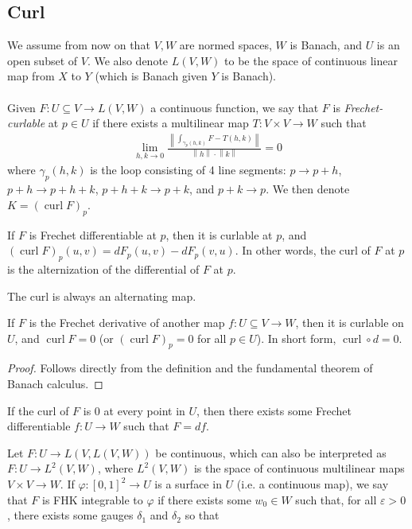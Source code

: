 \documentclass{treatise}
\begin{document}
\begin{shaded}
\subsection{Curl}
We assume from now on that $V, W$ are normed spaces, $W$ is Banach, and $U$ is an open subset of $V$. We also denote $L(V, W)$ to be the space of continuous linear map from $X$ to $Y$ (which is Banach given $Y$ is Banach).
\\
\\
Given $F: U \subseteq V \to L(V, W)$ a continuous function, we say that $F$ is \emph{Frechet-curlable} at $p \in U$ if there exists a multilinear map $T: V \times V \to W$ such that
\begin{align*}
\lim_{h, k \to 0} \frac{\left\lVert \int_{\gamma_p (h, k)} F - T(h, k) \right\rVert}{\left\lVert h \right\rVert \cdot \left\lVert k \right\rVert} = 0
\end{align*}
where $\gamma_p (h, k)$ is the loop consisting of 4 line segments: $p \to p + h$, $p + h \to p + h + k$, $p + h + k \to p + k$, and $p + k \to p$. We then denote $K = (\operatorname{curl} F)_p$.
\begin{theorem}
If $F$ is Frechet differentiable at $p$, then it is curlable at $p$, and $(\operatorname{curl} F)_p (u, v) = dF_p (u, v) - dF_p (v, u)$. In other words, the curl of $F$ at $p$ is the alternization of the differential of $F$ at $p$.
\end{theorem}
\begin{corollary}
The curl is always an alternating map.
\end{corollary}
\begin{theorem}
If $F$ is the Frechet derivative of another map $f: U \subseteq V \to W$, then it is curlable on $U$, and $\operatorname{curl} F = 0$ (or $(\operatorname{curl} F)_p = 0$ for all $p \in U$). In short form, $\operatorname{curl} \circ d = 0$.
\end{theorem}
\begin{proof}
Follows directly from the definition and the fundamental theorem of Banach calculus.
\end{proof}
\begin{theorem}[Exactness]
If the curl of $F$ is $0$ at every point in $U$, then there exists some Frechet differentiable $f: U \to W$ such that $F = df$.
\end{theorem}
Let $F: U \to L(V, L(V, W))$ be continuous, which can also be interpreted as $F: U \to L^2 (V, W)$, where $L^2(V, W)$ is the space of continuous multilinear maps $V \times V \to W$. If $\varphi: [0, 1]^2 \to U$ is a surface in $U$ (i.e. a continuous map), we say that $F$ is FHK integrable to $\varphi$ if there exists some $w_0 \in W$ such that, for all $\varepsilon > 0$, there exists some gauges $\delta_1$ and $\delta_2$ so that

\end{shaded}
\end{document}
